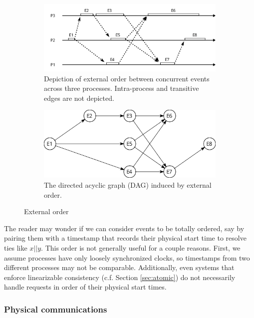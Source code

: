 \documentclass[]             %
{NASA}                       %
\theoremstyle{definition}
\begin{document}
\begin{figure}
     \begin{subfigure}[a]{1\textwidth}
         \center
         \includegraphics[scale=0.4]{images/externalorder.png}
         \caption{Depiction of external order between concurrent events across three processes. Intra-process and transitive edges are not depicted.}
         \label{fig:externalorderexec}
     \end{subfigure}
     \begin{subfigure}[b]{1\textwidth}
         \center
         \includegraphics[scale=0.25]{images/partialorder.png}
         \caption{The directed acyclic graph (DAG) induced by external order.}
         \label{fig:externalorderdag}
     \end{subfigure}
     \caption{External order}
     \label{fig:externalorder}
\end{figure}

The reader may wonder if we can consider events to be totally ordered,
say by pairing them with a timestamp that records their physical start
time to resolve ties like \(x || y\). This order is not generally useful
for a couple reasons. First, we assume processes have only loosely
synchronized clocks, so timestamps from two different processes may not
be comparable. Additionally, even systems that enforce linearizable
consistency (c.f. Section \ref{sec:atomic}) do not necessarily handle
requests in order of their physical start times.

\hypertarget{physical-communications}{%
\subsubsection{Physical communications}\label{physical-communications}}
\end{document}
